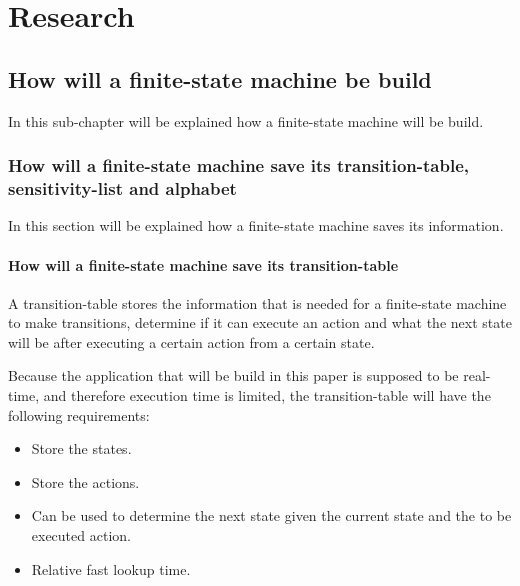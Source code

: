 \hypertarget{research}{%
\chapter{Research}\label{research}}

\hypertarget{how-will-a-finite-state-machine-be-build}{%
\section{How will a finite-state machine be
build}\label{how-will-a-finite-state-machine-be-build}}

In this sub-chapter will be explained how a finite-state machine will be
build.

\hypertarget{how-will-a-finite-state-machine-save-its-transition-table-sensitivity-list-and-alphabet}{%
\subsection{How will a finite-state machine save its transition-table,
sensitivity-list and
alphabet}\label{how-will-a-finite-state-machine-save-its-transition-table-sensitivity-list-and-alphabet}}

In this section will be explained how a finite-state machine saves its
information.

\hypertarget{how-will-a-finite-state-machine-save-its-transition-table}{%
\subsubsection{How will a finite-state machine save its
transition-table}\label{how-will-a-finite-state-machine-save-its-transition-table}}

A transition-table stores the information that is needed for a
finite-state machine to make transitions, determine if it can execute an
action and what the next state will be after executing a certain action
from a certain state.

Because the application that will be build in this paper is supposed to
be real-time, and therefore execution time is limited, the
transition-table will have the following requirements:

\begin{itemize}
\tightlist
\item
  Store the states.
\item
  Store the actions.
\item
  Can be used to determine the next state given the current state and
  the to be executed action.
\item
  Relative fast lookup time.
\end{itemize}

